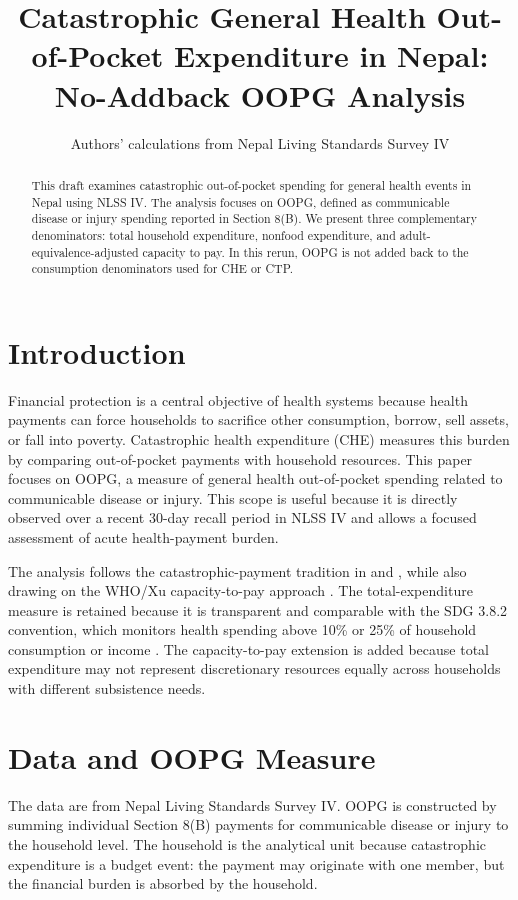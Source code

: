 \documentclass[11pt]{article}
\title{Catastrophic General Health Out-of-Pocket Expenditure in Nepal: No-Addback OOPG Analysis}
\author{Authors' calculations from Nepal Living Standards Survey IV}
\date{}
\begin{document}
\maketitle

\begin{abstract}
This draft examines catastrophic out-of-pocket spending for general health events in Nepal using NLSS IV. The analysis focuses on OOPG, defined as communicable disease or injury spending reported in Section 8(B). We present three complementary denominators: total household expenditure, nonfood expenditure, and adult-equivalence-adjusted capacity to pay. In this rerun, OOPG is not added back to the consumption denominators used for CHE or CTP.
\end{abstract}

\section{Introduction}

Financial protection is a central objective of health systems because health payments can force households to sacrifice other consumption, borrow, sell assets, or fall into poverty. Catastrophic health expenditure (CHE) measures this burden by comparing out-of-pocket payments with household resources. This paper focuses on OOPG, a measure of general health out-of-pocket spending related to communicable disease or injury. This scope is useful because it is directly observed over a recent 30-day recall period in NLSS IV and allows a focused assessment of acute health-payment burden.

The analysis follows the catastrophic-payment tradition in \citet{odonnell2008} and \citet{wagstaff2003}, while also drawing on the WHO/Xu capacity-to-pay approach \citep{xu2003,xu2005}. The total-expenditure measure is retained because it is transparent and comparable with the SDG 3.8.2 convention, which monitors health spending above 10\% or 25\% of household consumption or income \citep{who2026sdg382}. The capacity-to-pay extension is added because total expenditure may not represent discretionary resources equally across households with different subsistence needs.

\section{Data and OOPG Measure}

The data are from Nepal Living Standards Survey IV. OOPG is constructed by summing individual Section 8(B) payments for communicable disease or injury to the household level. The household is the analytical unit because catastrophic expenditure is a budget event: the payment may originate with one member, but the financial burden is absorbed by the household.
\end{document}

